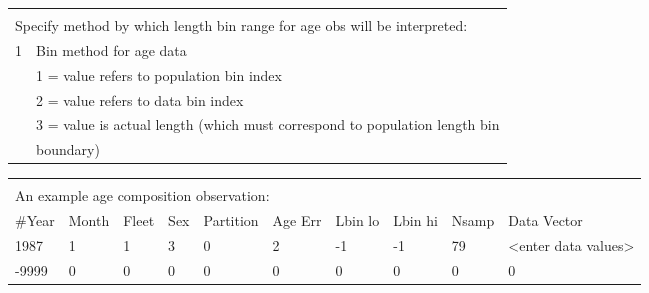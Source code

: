 			
\begin{tabular}{p{1cm} p{14cm}}
	 & \\
	\multicolumn{2}{l}{Specify method by which length bin range for age obs will be interpreted:}\\
	\hline
	1 & Bin method for age data\\
	  & 1 = value refers to population bin index\\
	  & 2 = value refers to data bin index\\
	  & 3 = value is actual length (which must correspond to population length bin  \\
	  & boundary)\\
	 \hline
\end{tabular}


\begin{tabular}{p{1cm} p{1cm} p{1cm} p{1cm} p{1.5cm} p{1cm} p{1cm} p{1cm} p{1cm} p{2.1cm}}
	\multicolumn{10}{l}{ }\\
	\multicolumn{10}{l}{An example age composition observation:}\\
	\hline
	\#Year & Month & Fleet & Sex & Partition & Age Err & Lbin lo & Lbin hi & Nsamp & Data Vector \\
	\hline
	1987 & 1 & 1 & 3 & 0 & 2 & -1 & -1 & 79 & <enter data values>\\
	-9999 & 0 & 0 & 0 & 0 & 0 & 0 & 0 & 0 & 0\\
	\hline
\end{tabular}



